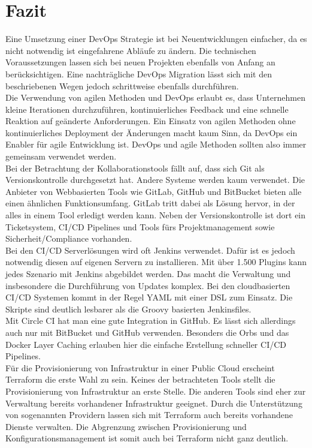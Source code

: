 \section{Fazit}\label{fazit}

Eine Umsetzung einer DevOps Strategie ist bei Neuentwicklungen einfacher, da es nicht notwendig ist eingefahrene Abläufe zu ändern.
Die technischen Voraussetzungen lassen sich bei neuen Projekten ebenfalls von Anfang an berücksichtigen.
Eine nachträgliche DevOps Migration lässt sich mit den beschriebenen Wegen jedoch schrittweise ebenfalls durchführen. \\

Die Verwendung von agilen Methoden und DevOps erlaubt es, dass Unternehmen kleine Iterationen durchzuführen, kontinuierliches Feedback und eine schnelle Reaktion auf geänderte Anforderungen.
Ein Einsatz von agilen Methoden ohne kontinuierliches Deployment der Änderungen macht kaum Sinn, da DevOps ein Enabler für agile Entwicklung ist.
DevOps und agile Methoden sollten also immer gemeinsam verwendet werden. \\

Bei der Betrachtung der Kollaborationstools fällt auf, dass sich Git als Versionskontrolle durchgesetzt hat.
Andere Systeme werden kaum verwendet.
Die Anbieter von Webbasierten Tools wie GitLab, GitHub und BitBucket bieten alle einen ähnlichen Funktionsumfang.
GitLab tritt dabei als Lösung hervor, in der alles in einem Tool erledigt werden kann.
Neben der Versionskontrolle ist dort ein Ticketsystem, CI/CD Pipelines und Tools fürs Projektmanagement sowie Sicherheit/Compliance vorhanden. \\

Bei den CI/CD Serverlösungen wird oft Jenkins verwendet.
Dafür ist es jedoch notwendig diesen auf eigenen Servern zu installieren.
Mit über 1.500 Plugins kann jedes Szenario mit Jenkins abgebildet werden.
Das macht die Verwaltung und insbesondere die Durchführung von Updates komplex.
Bei den cloudbasierten CI/CD Systemen kommt in der Regel YAML mit einer DSL zum Einsatz.
Die Skripte sind deutlich lesbarer als die Groovy basierten Jenkinsfiles. \\

Mit Circle CI hat man eine gute Integration in GitHub.
Es lässt sich allerdings auch nur mit BitBucket und GitHub verwenden.
Besonders die Orbs und das Docker Layer Caching erlauben hier die einfache Erstellung schneller CI/CD Pipelines. \\

Für die Provisionierung von Infrastruktur in einer Public Cloud erscheint Terraform die erste Wahl zu sein.
Keines der betrachteten Tools stellt die Provisionierung von Infrastruktur an erste Stelle.
Die anderen Tools sind eher zur Verwaltung bereits vorhandener Infrastruktur geeignet.
Durch die Unterstützung von sogenannten Providern lassen sich mit Terraform auch bereits vorhandene Dienste verwalten.
Die Abgrenzung zwischen Provisionierung und Konfigurationsmanagement ist somit auch bei Terraform nicht ganz deutlich. \\

